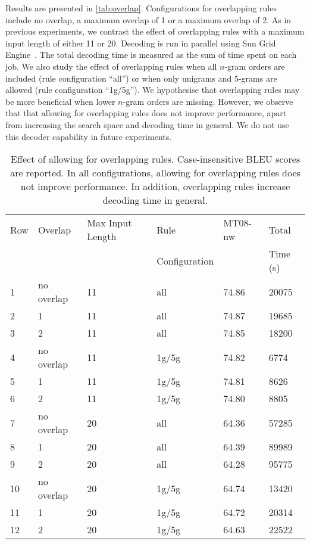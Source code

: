 Results are presented in
\autoref{tab:overlap}. Configurations for overlapping rules
include no overlap, a maximum overlap of 1 or a maximum overlap of 2.
As in previous experiments, we contrast the effect of overlapping
rules with a maximum input length of either 11 or 20.
Decoding is run in parallel using Sun Grid Engine~\citep{gentzsch:2001:CCG}.
The total decoding time is measured as the sum of time spent
on each job.
We also study the effect of overlapping rules when
all $n$-gram orders are included (rule configuration ``all'') or
when only unigrams and 5-grams are allowed (rule configuration ``1g/5g'').
We hypothesise that overlapping rules may be more beneficial
when lower $n$-gram orders are missing.
However, we observe that
that allowing for overlapping rules does not improve performance, apart from 
increasing the search space and decoding time in general.
We do not use this decoder capability in future experiments.

\begin{table}
  \begin{center}
  \begin{tabular}{l|l|l|l|l|l}
    Row & Overlap & Max Input Length &  Rule & MT08-nw & Total  \\
        &         &                  & Configuration & & Time (s)\\
    \hline
    1 & no overlap & 11 & all & 74.86 & 20075 \\
    2 & 1          & 11 & all & 74.87 & 19685 \\
    3 & 2          & 11 & all & 74.85 & 18200 \\
    \hline
    4 & no overlap & 11 & 1g/5g & 74.82 & 6774 \\
    5 & 1          & 11 & 1g/5g & 74.81 & 8626 \\
    6 & 2          & 11 & 1g/5g & 74.80 & 8805 \\
    \hline
    7 & no overlap & 20 & all & 64.36 & 57285 \\
    8 & 1          & 20 & all & 64.39 & 89989 \\
    9 & 2          & 20 & all & 64.28 & 95775 \\
    \hline
    10 & no overlap & 20 & 1g/5g & 64.74 & 13420 \\
    11 & 1          & 20 & 1g/5g & 64.72 & 20314 \\
    12 & 2          & 20 & 1g/5g & 64.63 & 22522 \\
  \end{tabular}
  \caption{Effect of allowing for overlapping rules. Case-insensitive BLEU
    scores are reported. In all configurations, allowing for overlapping
    rules does not improve performance. In addition, overlapping
    rules increase decoding time in general.}
  \label{tab:overlap}
  \end{center}
\end{table}

